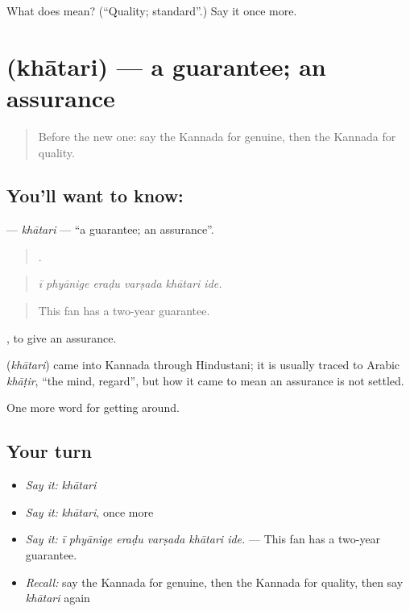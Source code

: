 \begin{tcolorbox}[breakable,colback=teal!4,colframe=teal!35!black,title={Before you move on}]
What does  mean? (\textquotedblleft{}Quality; standard\textquotedblright{}.) Say it once more.
\end{tcolorbox}
\section[\texorpdfstring{\kn{ಖಾತರಿ} (khātari)}{ಖಾತರಿ (khātari)}]{ (khātari) — a guarantee; an assurance}

\label{lesson:KA-C468-khatari}



\begin{quote}
Before the new one: say the Kannada for genuine, then the Kannada for quality.
\end{quote}

\subsection*{You'll want to know: }
\textbf{} — \emph{khātari} — \textquotedblleft{}a guarantee; an assurance\textquotedblright{}.

\begin{quote}
     .
\end{quote}

\begin{quote}
\emph{ī phyānige eraḍu varṣada khātari ide.}
\end{quote}

\begin{quote}
This fan has a two-year guarantee.
\end{quote}

 , to give an assurance.

\begin{cousinweb}
\textbf{} (\emph{khātari}) came into Kannada through Hindustani; it is usually traced to Arabic \emph{khāṭir}, \textquotedblleft{}the mind, regard\textquotedblright{}, but how it came to mean an assurance is not settled.
\end{cousinweb}

\begin{grammarlens}[title={What you've built}]
One more word for getting around.
\end{grammarlens}

\subsection*{Your turn}
\begin{itemize}
\raggedright
  \item \emph{Say it:} \emph{khātari}
  \item \emph{Say it:} \emph{khātari}, once more
  \item \emph{Say it:} \emph{ī phyānige eraḍu varṣada khātari ide.} — This fan has a two-year guarantee.
  \item \emph{Recall:} say the Kannada for genuine, then the Kannada for quality, then say \emph{khātari} again
\end{itemize}

